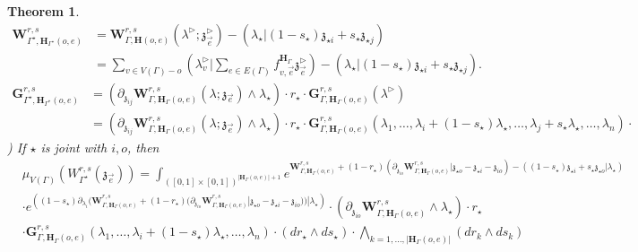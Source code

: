 \documentclass[11pt]{amsart}
\newtheorem{thm}{Theorem}[section]
\theoremstyle{definition}
\theoremstyle{remark}
\numberwithin{equation}{section}
\begin{document}
\begin{thm}
\fi
\begin{align*}
      \mathbf{W}^{r,s}_{\Gamma^{\star},\mathbf{H}_{\Gamma^{\star}}(o,e)} &= \mathbf{W}^{r,s}_{\Gamma,\mathbf{H}(o,e)}(\lambda^\triangleright;\mathfrak{z}^\triangleright_{\vec{e}}) -\left(\lambda_{\star}|(1-s_{\star})\mathfrak{z}_{\star i}+s_{\star}\mathfrak{z}_{\star j}\right) \\
   & =\sum_{v\in V(\Gamma)-o}(\lambda^\triangleright_v|\sum_{e\in E(\Gamma)}f^{\mathbf{H}_{\Gamma}}_{v,\vec{e}}\mathfrak{z}^\triangleright_{\vec{e}})-\left(\lambda_{\star}|(1-s_{\star})\mathfrak{z}_{\star i}+s_{\star}\mathfrak{z}_{\star j}\right).
\end{align*}
\begin{align*}
  \mathbf{G}^{r,s}_{\Gamma^{\star},\mathbf{H}_{\Gamma^{\star}}(o,e)} &= \left(\partial_{\mathfrak{z}_{ij}}\mathbf{W}^{r,s}_{\Gamma,\mathbf{H}_{\Gamma}(o,e)}(\lambda;\mathfrak{z}_{\vec{e}})\wedge\lambda_{\star}\right)\cdot  r_{\star}\cdot\mathbf{G}^{r,s}_{\Gamma,\mathbf{H}_{\Gamma}(o,e)}(\lambda^\triangleright) \\
   & =\left(\partial_{\mathfrak{z}_{ij}}\mathbf{W}^{r,s}_{\Gamma,\mathbf{H}_{\Gamma}(o,e)}(\lambda;\mathfrak{z}_{\vec{e}})\wedge\lambda_{\star}\right)\cdot r_{\star}\cdot\mathbf{G}^{r,s}_{\Gamma,\mathbf{H}_{\Gamma}(o,e)}(\lambda_1,\dots,\lambda_i+(1-s_{\star})\lambda_{\star},\dots,\lambda_j+s_{\star}\lambda_{\star},\dots,\lambda_{n})\cdot
\end{align*}
) If $\star$ is joint with $i,o$, then
\begin{align*}
& \mu_{V(\Gamma)}\left(W^{r,s}_{\Gamma^{\star}}(\mathfrak{z}_{\vec{e}})\right)  = \int_{([0,1]\times[0,1])^{|\mathbf{H}_{\Gamma}(o,e)|+1}} e^{\mathbf{W}^{r,s}_{\Gamma,\mathbf{H}_{\Gamma}(o,e)}+(1-r_{\star})\left(\partial_{\mathfrak{z}_{io}}\mathbf{W}^{r,s}_{\Gamma,\mathbf{H}_{\Gamma}(o,e)}|\mathfrak{z}_{\star o}-\mathfrak{z}_{\star i}-\mathfrak{z}_{io}\right)-\left((1-s_{\star})\mathfrak{z}_{\star i}+s_{\star}\mathfrak{z}_{\star o}|\lambda_{\star}\right)} \\
   & \cdot e^{\left((1-s_{\star})\partial_{\lambda_i}(\mathbf{W}^{r,s}_{\Gamma,\mathbf{H}_{\Gamma}(o,e)}+(1-r_{\star})(\partial_{\mathfrak{z}_{io}}\mathbf{W}^{r,s}_{\Gamma,\mathbf{H}_{\Gamma}(o,e)}|\mathfrak{z}_{\star o}-\mathfrak{z}_{\star i}-\mathfrak{z}_{io}))|\lambda_{\star}\right)}\cdot \left(\partial_{\mathfrak{z}_{io}}\mathbf{W}^{r,s}_{\Gamma,\mathbf{H}_{\Gamma}(o,e)}\wedge\lambda_{\star}\right)\cdot r_{\star}\\
   &\cdot  \mathbf{G}^{r,s}_{\Gamma,\mathbf{H}_{\Gamma}(o,e)}(\lambda_1,\dots,\lambda_i+(1-s_{\star})\lambda_{\star},\dots,\lambda_{n})\cdot (dr_{\star}\wedge ds_{\star})\cdot \bigwedge_{k=1,\dots,|\mathbf{H}_{\Gamma}(o,e)|} (dr_k\wedge ds_k)

\end{align*}
\end{thm}
\end{document}
